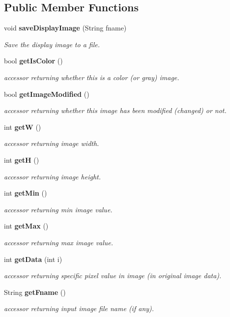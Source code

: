 \subsection*{Public Member Functions}
\begin{CompactItemize}
\item 
void {\bf save\-Display\-Image} (String fname)
\begin{CompactList}\small\item\em Save the display image to a file. \item\end{CompactList}\item 
bool {\bf get\-Is\-Color} ()
\begin{CompactList}\small\item\em accessor returning whether this is a color (or gray) image. \item\end{CompactList}\item 
bool {\bf get\-Image\-Modified} ()
\begin{CompactList}\small\item\em accessor returning whether this image has been modified (changed) or not. \item\end{CompactList}\item 
int {\bf get\-W} ()
\begin{CompactList}\small\item\em accessor returning image width. \item\end{CompactList}\item 
int {\bf get\-H} ()
\begin{CompactList}\small\item\em accessor returning image height. \item\end{CompactList}\item 
int {\bf get\-Min} ()
\begin{CompactList}\small\item\em accessor returning min image value. \item\end{CompactList}\item 
int {\bf get\-Max} ()
\begin{CompactList}\small\item\em accessor returning max image value. \item\end{CompactList}\item 
int {\bf get\-Data} (int i)
\begin{CompactList}\small\item\em accessor returning specific pixel value in image (in original image data). \item\end{CompactList}\item 
String {\bf get\-Fname} ()
\begin{CompactList}\small\item\em accessor returning input image file name (if any). \item\end{CompactList}\end{CompactItemize}
